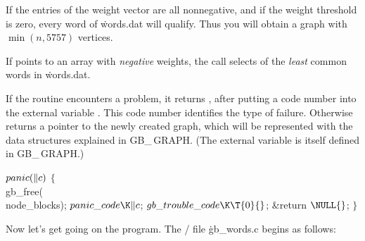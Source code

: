 If the entries of the weight vector are all nonnegative, and if the
weight threshold is zero, every word of \.{words.dat} will qualify. Thus
you will obtain a graph with $\min(n,5757)$ vertices.

If  points to an array with {\sl negative\/} weights, the call
 selects  of the {\sl
least\/} common
words in \.{words.dat}.

\fi

If the  routine encounters a problem, it returns \PB{$%
\NULL$}, after putting
a code number into the external variable . This code number
identifies the type of failure. Otherwise  returns a pointer to
the
newly created graph, which will be represented with the data structures
explained in {\sc GB\_\,GRAPH}. (The external variable  is
itself
defined in {\sc GB\_\,GRAPH}.)

\Y\B\4\D$\\{panic}(\|c)$ \5
${}\{{}$\5
\1\\{gb\_free}(\\{node\_blocks});\6
${}\\{panic\_code}\K\|c{}$;\5
${}\\{gb\_trouble\_code}\K\T{0}{}$;\5
\&{return} ${}\NULL{}$;\5
${}\}{}$\2\par
\fi

Now let's get going on the program. The \CEE/ file \.{gb\_words.c} begins
as follows:

